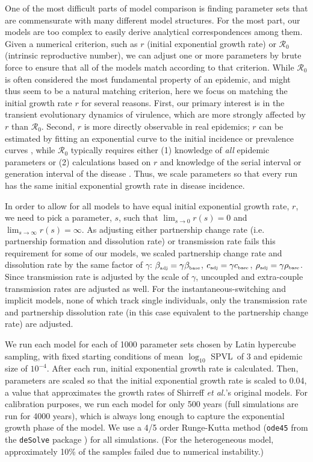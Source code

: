 \documentclass[10pt,letterpaper]{article}
\newcommand{\Lspvl}{$\log_{10}$ SPVL}
\newcommand{\rzero}{{\mathcal R}_0}
\newcommand{\etal}{\textit{et al.}}
\newcommand{\tsub}[2]{#1_{{\textrm{\tiny #2}}}}
\begin{document}
One of the most difficult parts of model comparison is finding
parameter sets that are commensurate with many different model
structures. For the most part, our models are too complex to easily
derive analytical correspondences among them. Given a numerical
criterion, such as $r$ (initial exponential growth rate) or $\rzero$ 
(intrinsic reproductive number), we can adjust one or more
parameters by brute force to ensure that all of the models match
according to that criterion. While $\rzero$ is often considered
the most fundamental property of an epidemic, and might thus seem to
be a natural matching criterion, here we focus on matching the initial
growth rate $r$ for several reasons. First, our primary interest is in
the transient evolutionary dynamics of virulence, which are more
strongly affected by $r$ than $\rzero$. Second, $r$ is 
more directly observable in real epidemics; $r$ can be estimated by
fitting an exponential curve to the initial incidence or
prevalence curves \cite{ma_estimating_2014}, while $\rzero$
typically requires either (1) knowledge of \emph{all} epidemic
parameters or (2) calculations based on
$r$ and knowledge of the serial interval or generation interval of the
disease \cite{wallinga_how_2007}. Thus, we scale parameters so that
every run has the same initial exponential growth rate in 
disease incidence.

In order to allow for all models to have equal initial exponential
growth rate, $r$, we need to pick a parameter, $s$, such that
$\lim_{s\to 0} r(s) = 0$ and $\lim_{s\to\infty} r(s) = \infty$. As
adjusting either partnership change rate (i.e. partnership formation
and dissolution rate) or transmission rate fails this requirement for
some of our models, we scaled partnership change rate and
dissolution rate by the same factor of $\gamma$: $\tsub{\beta}{adj} =
\gamma \tsub{\beta}{base}$, $\tsub{c}{adj} = \gamma \tsub{c}{base}$,
$\tsub{\rho}{adj} = \gamma \tsub{\rho}{base}$. Since transmission rate
is adjusted by the scale of $\gamma$, uncoupled and extra-couple
transmission rates are adjusted as well. For the instantaneous-switching
and implicit models, none of which track single individuals, 
only the transmission rate and partnership
dissolution rate (in this case equivalent to the partnership change
rate) are adjusted.

We run each model for each of 1000 parameter sets chosen by Latin hypercube sampling, with fixed starting conditions
of mean \Lspvl\ of 3 and epidemic size of $10^{-4}$. After each run, initial exponential growth rate is calculated. Then, parameters are scaled so that the initial exponential growth rate is scaled to 0.04, a value that approximates the growth rates of Shirreff \etal's original models.
For calibration purposes, we run each model for only 500 years
(full simulations are run for 4000 years), which is always long
enough to capture the exponential growth phase of the model. 
We use a 4/5 order 
Runge-Kutta method (\texttt{ode45} from the \texttt{deSolve} package
\cite{soetaert_solving_2010}) for all simulations. 
(For the heterogeneous model, approximately
10\% of the samples failed due to numerical instability.)
\end{document}

